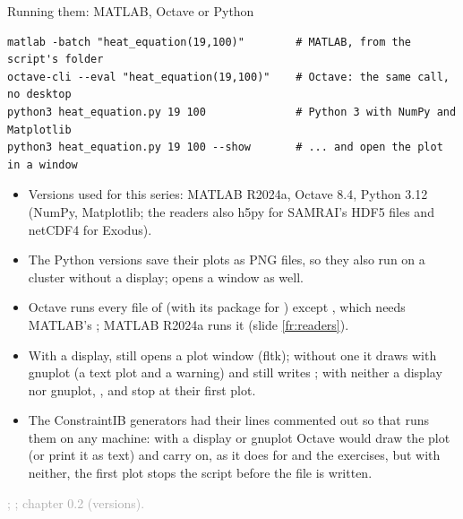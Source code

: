 \documentclass[aspectratio=169,11pt]{beamer}
\newcommand{\sourcecredit}[1]{\vfill\begin{flushright}\tiny\textcolor{DarkGray}{#1}\end{flushright}}
\begin{document}
\begin{frame}[fragile]{Running them: MATLAB, Octave or Python}
\label{fr:run}
\begin{lstlisting}[style=shell]
matlab -batch "heat_equation(19,100)"        # MATLAB, from the script's folder
octave-cli --eval "heat_equation(19,100)"    # Octave: the same call, no desktop
python3 heat_equation.py 19 100              # Python 3 with NumPy and Matplotlib
python3 heat_equation.py 19 100 --show       # ... and open the plot in a window
\end{lstlisting}
\footnotesize
\begin{itemize}\setlength{\itemsep}{1pt}
  \item Versions used for this series: MATLAB R2024a, Octave 8.4, Python 3.12 (NumPy, Matplotlib; the readers also h5py for SAMRAI's HDF5 files and netCDF4 for Exodus).
  \item The Python versions save their plots as PNG files, so they also run on a cluster without a display;  opens a window as well.
  \item Octave runs every  file of  (with its  package for ) except , which needs MATLAB's ; MATLAB R2024a runs it (slide \ref{fr:readers}).
  \item With a display,  still opens a plot window (fltk); without one it draws with gnuplot (a text plot and a warning) and  still writes ; with neither a display nor gnuplot, ,  and  stop at their first plot.
  \item The ConstraintIB generators had their  lines commented out so that  runs them on any machine: with a display or gnuplot Octave would draw the plot (or print it as text) and carry on, as it does for  and the exercises, but with neither, the first plot stops the script before the file is written.
\end{itemize}
\sourcecredit{; \code{examples/analysis/README.md}; chapter 0.2 (versions).}
\end{frame}
\end{document}
